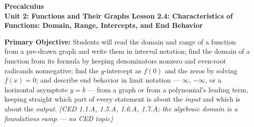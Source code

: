 \documentclass[10pt]{article}
\newcommand{\CourseName}{Precalculus}
\newcommand{\UnitNumberName}{Unit 2: Functions and Their Graphs \quad}
\newcommand{\LessonNumberName}{Lesson 2.4: Characteristics of Functions: Domain, Range, Intercepts, and End Behavior}
\begin{document}
\begin{center}
    {\Large\bfseries \CourseName \\
    {\small\bfseries \UnitNumberName \LessonNumberName}}
\end{center}

\begin{tcolorbox}[colback=lilac, colframe=plum, boxrule=0.9pt, arc=2mm,
    left=2mm, right=2mm, top=1.5mm, bottom=1.5mm]
    \textbf{Primary Objective:} Students will read the domain and range of a function from a
    pre-drawn graph and write them in interval notation; find the domain of a function from its
    formula by keeping denominators nonzero and even-root radicands nonnegative; find the
    $y$-intercept as $f(0)$ and the zeros by solving $f(x) = 0$; and describe end behavior in
    limit notation --- $\infty$, $-\infty$, or a horizontal asymptote $y = b$ --- from a graph
    or from a polynomial's leading term, keeping straight which part of every statement is about
    the \textit{input} and which is about the \textit{output}.
    \hfill\textit{\small (CED 1.1.A, 1.5.A, 1.6.A, 1.7.A; the algebraic domain is a
    foundations ramp --- no CED topic)}
\end{tcolorbox}
\end{document}
